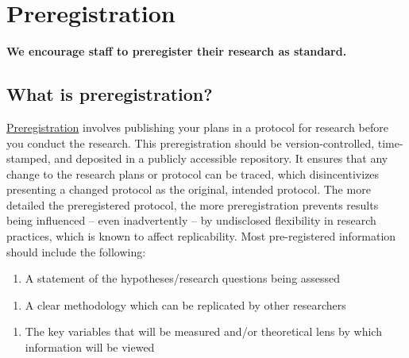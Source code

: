 \documentclass[
  letterpaper,
  DIV=11,
  numbers=noendperiod]{scrreprt}
\author{}
\date{}
\providecommand{\tightlist}{%
  \setlength{\itemsep}{0pt}\setlength{\parskip}{0pt}}\usepackage{longtable,booktabs,array}
\begin{document}
\ifdefined\Shaded\renewenvironment{Shaded}{\begin{tcolorbox}[frame hidden, boxrule=0pt, breakable, sharp corners, enhanced, interior hidden, borderline west={3pt}{0pt}{shadecolor}]}{\end{tcolorbox}}\fi

\hypertarget{Preregistration}{%
\chapter{Preregistration}\label{Preregistration}}

\textbf{We encourage staff to preregister their research as standard.}~

\hypertarget{what-is-preregistration}{%
\section{What is preregistration?~}\label{what-is-preregistration}}

\href{https://www.pnas.org/doi/10.1073/pnas.1708274114}{Preregistration}
involves publishing your plans in a protocol for research before you
conduct the research. This preregistration should be version-controlled,
time-stamped, and deposited in a publicly accessible repository. It
ensures that any change to the research plans or protocol can be traced,
which disincentivizes presenting a changed protocol as the original,
intended protocol. The more detailed the preregistered protocol, the
more preregistration prevents results being influenced -- even
inadvertently -- by undisclosed flexibility in research practices, which
is known to affect replicability. Most pre-registered information should
include the following:~

\begin{enumerate}
\def\labelenumi{\arabic{enumi}.}
\tightlist
\item
  A statement of the hypotheses/research questions being assessed~
\end{enumerate}

\begin{enumerate}
\def\labelenumi{\arabic{enumi}.}
\setcounter{enumi}{1}
\tightlist
\item
  A clear methodology which can be replicated by other researchers~
\end{enumerate}

\begin{enumerate}
\def\labelenumi{\arabic{enumi}.}
\setcounter{enumi}{2}
\tightlist
\item
  The key variables that will be measured and/or theoretical lens by
  which information will be viewed~
\end{enumerate}
\end{document}
